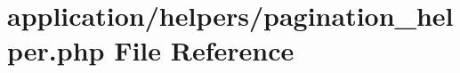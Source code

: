 \hypertarget{pagination__helper_8php}{\section{application/helpers/pagination\-\_\-helper.php File Reference}
\label{pagination__helper_8php}
}
